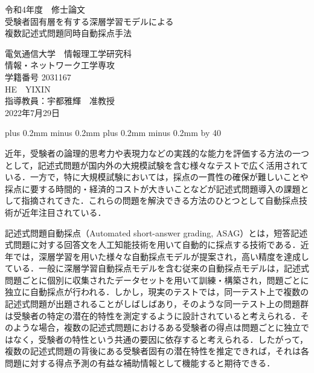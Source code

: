 \documentclass[a4paper,12pt,oneside,openany]{jsbook}
\def\kcharparline#1{%
   \ifx\xkanjiskip\undefined%
   \jintercharskip 0mm plus 0.2mm minus 0.2mm
   \else
   \xkanjiskip 0mm plus 0.2mm minus 0.2mm
   \fi
   \settowidth{\textwidth}{}%
   \multiply\textwidth by #1}
\begin{document}
\begin{titlepage}

\begin{center}
{\Large 令和4年度　修士論文}\\ %
\vspace*{120truept}
{\LARGE 受験者固有層を有する深層学習モデルによる}\\ %
{\LARGE 複数記述式問題同時自動採点手法}\\ %
\vspace{100truept}

{\LARGE 電気通信大学　情報理工学研究科}\\ %
\vspace{10truept}
{\LARGE 情報・ネットワーク工学専攻}\\ %
\vspace{10truept}
{\LARGE 学籍番号 2031167}\\ %
\vspace{50truept}
{\LARGE HE　YIXIN}\\ %
\vspace{50truept}
{\LARGE 指導教員：宇都雅輝　准教授}\\
\vspace{50truept}
{\LARGE 2022年7月29日}\\ %
\end{center}
\end{titlepage}
\kcharparline{40} %

\frontmatter

近年，受験者の論理的思考力や表現力などの実践的な能力を評価する方法の一つとして，記述式問題が国内外の大規模試験を含む様々なテストで広く活用されている．一方で，特に大規模試験においては，採点の一貫性の確保が難しいことや採点に要する時間的・経済的コストが大きいことなどが記述式問題導入の課題として指摘されてきた．これらの問題を解決できる方法のひとつとして自動採点技術が近年注目されている．

記述式問題自動採点（Automated short-answer grading, ASAG）とは，短答記述式問題に対する回答文を人工知能技術を用いて自動的に採点する技術である．近年では，深層学習を用いた様々な自動採点モデルが提案され，高い精度を達成している．一般に深層学習自動採点モデルを含む従来の自動採点モデルは，記述式問題ごとに個別に収集されたデータセットを用いて訓練・構築され，問題ごとに独立に自動採点が行われる．しかし，現実のテストでは，同一テスト上で複数の記述式問題が出題されることがしばしばあり，そのような同一テスト上の問題群は受験者の特定の潜在的特性を測定するように設計されていると考えられる．そのような場合，複数の記述式問題におけるある受験者の得点は問題ごとに独立ではなく，受験者の特性という共通の要因に依存すると考えられる．したがって，複数の記述式問題の背後にある受験者固有の潜在特性を推定できれば，それは各問題に対する得点予測の有益な補助情報として機能すると期待できる．
\end{document}
